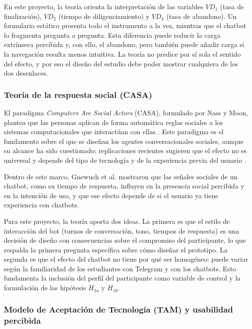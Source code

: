 \documentclass[12pt,letterpaper]{article}
\begin{document}
En este proyecto, la teoría orienta la interpretación de las variables $VD_1$ (tasa de finalización), $VD_2$ (tiempo de diligenciamiento) y $VD_4$ (tasa de abandono). Un formulario estático presenta todo el instrumento a la vez, mientras que el chatbot lo fragmenta pregunta a pregunta. Esta diferencia puede reducir la carga extrínseca percibida y, con ello, el abandono, pero también puede añadir carga si la navegación resulta menos intuitiva. La teoría no predice por sí sola el sentido del efecto, y por eso el diseño del estudio debe poder mostrar cualquiera de los dos desenlaces.

\subsubsection{Teoría de la respuesta social (CASA)}

El paradigma \textit{Computers Are Social Actors} (CASA), formulado por Nass y Moon, plantea que las personas aplican de forma automática reglas sociales a los sistemas computacionales que interactúan con ellas \cite{nass2000}. Este paradigma es el fundamento sobre el que se diseñan los agentes conversacionales sociales, aunque su alcance ha sido cuestionado: replicaciones recientes sugieren que el efecto no es universal y depende del tipo de tecnología y de la experiencia previa del usuario \cite{heyselaar2023}.

Dentro de este marco, Gnewuch et al. \cite{gnewuch2022} mostraron que las señales sociales de un chatbot, como su tiempo de respuesta, influyen en la presencia social percibida y en la intención de uso, y que ese efecto depende de si el usuario ya tiene experiencia con chatbots.

Para este proyecto, la teoría aporta dos ideas. La primera es que el estilo de interacción del bot (turnos de conversación, tono, tiempos de respuesta) es una decisión de diseño con consecuencias sobre el compromiso del participante, lo que respalda la primera pregunta específica sobre cómo diseñar el prototipo. La segunda es que el efecto del chatbot no tiene por qué ser homogéneo: puede variar según la familiaridad de los estudiantes con Telegram y con los chatbots. Esto fundamenta la inclusión del perfil del participante como variable de control y la formulación de las hipótesis $H_{1a}$ y $H_{1b}$.

\subsubsection{Modelo de Aceptación de Tecnología (TAM) y usabilidad percibida}
\end{document}
